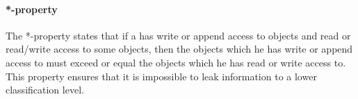 \paragraph{*-property}
The *-property states that if a \principal{} has write or append access to objects and read or read/write access to some objects, then the objects which he has write or append access to must exceed or equal the objects which he has read or write access to.
This property ensures that it is impossible to leak information to a lower classification level.

